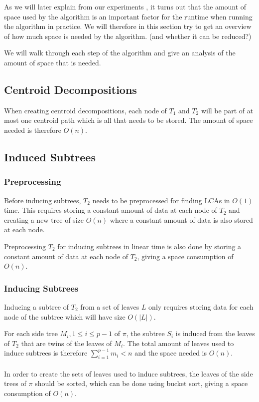 As we will later explain from our experiments , it turns out that the amount of space used by the algorithm is an important factor for the runtime when running the algorithm in practice. We will therefore in this section try to get an overview of how much space is needed by the algorithm. (and whether it can be reduced?)

We will walk through each step of the algorithm and give an analysis of the amount of space that is needed.

\subsection{Centroid Decompositions}
When creating centroid decompositions, each node of $T_1$ and $T_2$ will be part of at most one centroid path which is all that needs to be stored. The amount of space needed is therefore $O(n)$.

\subsection{Induced Subtrees}
\subsubsection{Preprocessing}
Before inducing subtrees, $T_2$ needs to be preprocessed for finding LCAs in $O(1)$ time. This requires storing a constant amount of data at each node of $T_2$ and creating a new tree of size $O(n)$ where a constant amount of data is also stored at each node.

Preprocessing $T_2$ for inducing subtrees in linear time is also done by storing a constant amount of data at each node of $T_2$, giving a space consumption of $O(n)$.

\subsubsection{Inducing Subtrees}
Inducing a subtree of $T_2$ from a set of leaves $L$ only requires storing data for each node of the subtree which will have size $O(|L|)$.

For each side tree $M_i, 1 \le i \le p-1$ of $\pi$, the subtree $S_i$ is induced from the leaves of $T_2$ that are twins of the leaves of $M_i$. The total amount of leaves used to induce subtrees is therefore $\sum_{i=1}^{p-1} m_i < n$ and the space needed is $O(n)$.
\\
\\
In order to create the sets of leaves used to induce subtrees, the leaves of the side trees of $\pi$ should be sorted, which can be done using bucket sort, giving a space consumption of $O(n)$.

